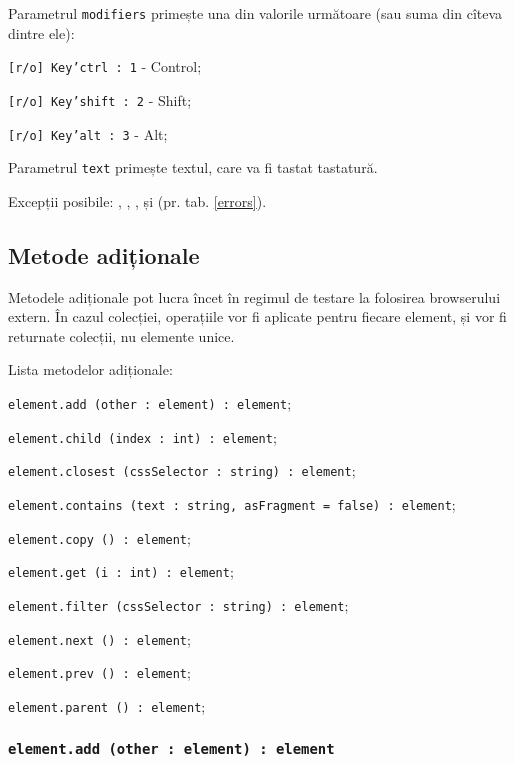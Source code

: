 Parametrul \texttt{modifiers} primește una din valorile următoare (sau suma din cîteva dintre ele):
\begin{icItems}
	\item \texttt{[r/o] Key'ctrl : 1} - Control;
	\item \texttt{[r/o] Key'shift : 2} - Shift;
	\item \texttt{[r/o] Key'alt : 3} - Alt;
\end{icItems}

Parametrul \texttt{text} primește textul, care va fi tastat tastatură.

Excepții posibile: , , ,   și  (pr. tab. \ref{errors}).

\subsection{Metode adiționale}

Metodele adiționale pot lucra încet în regimul de testare la folosirea browserului extern. În cazul colecției, operațiile vor fi aplicate pentru fiecare element, și vor fi returnate colecții, nu elemente unice. 

Lista metodelor adiționale:
\begin{icItems}
	\item \texttt{element.add (other : element) : element};
	\item \texttt{element.child (index : int) : element};
	\item \texttt{element.closest (cssSelector : string) : element};
	\item \texttt{element.contains (text : string, asFragment = false) : element};
	\item \texttt{element.copy () : element};
	\item \texttt{element.get (i : int) : element};
	\item \texttt{element.filter (cssSelector : string) : element};
	\item \texttt{element.next () : element};
	\item \texttt{element.prev () : element};
	\item \texttt{element.parent () : element};
\end{icItems}

\subsubsection{\texttt{element.add (other : element) : element}}

